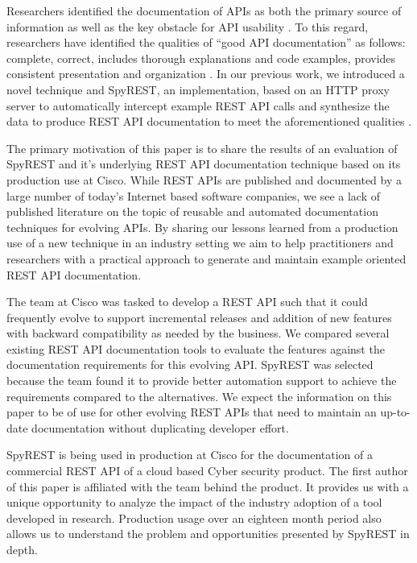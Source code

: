 Researchers identified the documentation of APIs as both the primary source of information as well as the key obstacle for API usability \cite{Robillard_what_makes}. To this regard, researchers have identified the qualities of ``good API documentation'' as follows: complete, correct, includes thorough explanations and code examples, provides consistent presentation and organization \cite{Robillard_what_makes,Myers_study}. In our previous work, we introduced a novel technique and SpyREST, an implementation, based on an HTTP proxy server to automatically intercept example REST API calls and synthesize the data to produce REST API documentation to meet the aforementioned qualities \cite{DBLP:conf/kbse/SohanAM15}.

The primary motivation of this paper is to share the results of an evaluation of SpyREST and it's underlying REST API documentation technique based on its production use at Cisco. While REST APIs are published and documented by a large number of today's Internet based software companies, we see a lack of published literature on the topic of reusable and automated documentation techniques for evolving APIs. By sharing our lessons learned from a production use of a new technique in an industry setting we aim to help practitioners and researchers with a practical approach to generate and maintain example oriented REST API documentation.

The team at Cisco was tasked to develop a REST API such that it could frequently evolve to support incremental releases and addition of new features with backward compatibility as needed by the business. We compared several existing REST API documentation tools to evaluate the features against the documentation requirements for this evolving API. SpyREST was selected because the team found it to provide better automation support to achieve the requirements compared to the alternatives. We expect the information on this paper to be of use for other evolving REST APIs that need to maintain an up-to-date documentation without duplicating developer effort.

SpyREST is being used in production at Cisco for the documentation of a commercial REST API of a cloud based Cyber security product. The first author of this paper is affiliated with the team behind the product. It provides us with a unique opportunity to analyze the impact of the industry adoption of a tool developed in research. Production usage over an eighteen month period also allows us to understand the problem and opportunities presented by SpyREST in depth.

